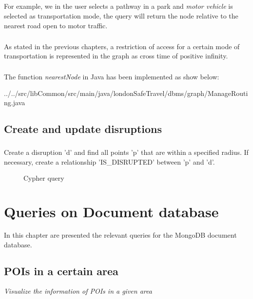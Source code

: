 \paragraph{}
For example, we in the user selects a pathway in a park and \textit{motor vehicle} is selected as transportation mode, the query will return the node relative to the nearest road open to motor traffic.

\paragraph{}
As stated in the previous chapters, a restriction of access for a certain mode of transportation is represented in the graph as cross time of positive infinity.

\paragraph{}
The function \textit{nearestNode} in Java has been implemented as show below:

{../../src/libCommon/src/main/java/londonSafeTravel/dbms/graph/ManageRouting.java}

\section{Create and update disruptions}
\paragraph{}
Create a disruption 'd' and find all points 'p' that are within a specified radius. If necessary, create a relationship 'IS\_DISRUPTED' between 'p' and 'd'.
\begin{figure}[H]
	
	\caption{Cypher query}
\end{figure} 

\chapter{Queries on Document database}
In this chapter are presented the relevant queries for the
MongoDB document database.

\section{POIs in a certain area}
\textit{Visualize the information of POIs in a given area}

